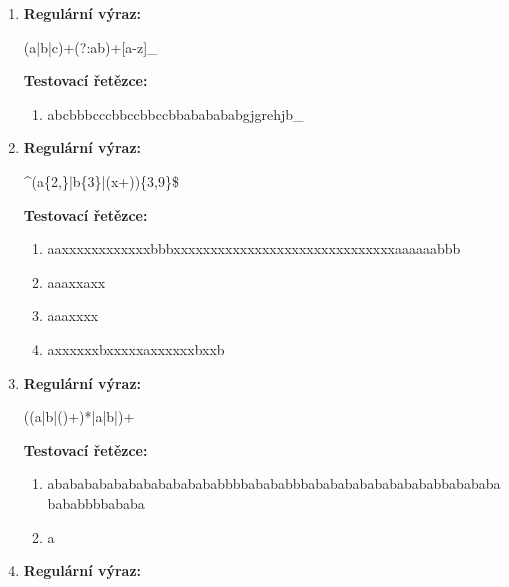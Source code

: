 \documentclass[czech,bachelor]{diploma}
\begin{document}
\begin{enumerate}
    \item 
    \noindent\textbf{Regulární výraz:} 

    (a|b|c)+(?:ab)+[a-z]\_

    \noindent\textbf{Testovací řetězce:}

    \begin{enumerate}
        \item abcbbbcccbbccbbccbbababababgjgrehjb\_ \setlength\parindent{1em} \textcolor{Red}{\XSolid} \label{itm:TD_4a}
    \end{enumerate}


    \item 
    \noindent\textbf{Regulární výraz:} 

    \textasciicircum (a\{2,\}|b\{3\}|(x+))\{3,9\}\$

    \noindent\textbf{Testovací řetězce:}

    \begin{enumerate}
        \item aaxxxxxxxxxxxxbbbxxxxxxxxxxxxxxxxxxxxxxxxxxxxxxaaaaaabbb \setlength\parindent{1em} \textcolor{OliveGreen}{\Checkmark} \label{itm:TD_5a}
        \item aaaxxaxx \setlength\parindent{1em} \textcolor{Red}{\XSolid}
        \item aaaxxxx \setlength\parindent{1em} \textcolor{OliveGreen}{\Checkmark}
        \item axxxxxxbxxxxxaxxxxxxbxxb \setlength\parindent{1em} \textcolor{Red}{\XSolid}
    \end{enumerate}


    \item 
    \noindent\textbf{Regulární výraz:} 
    
    ((a|b|()+)*|a|b|)+

    \noindent\textbf{Testovací řetězce:}

    \begin{enumerate}
        \item \parbox[t]{14cm}{ababababababababababababbbbabababbbabababababababababbababababababbbbab\-aba \setlength\parindent{1em} \textcolor{OliveGreen}{\Checkmark}} \label{itm:TD_6a}
        \item a \setlength\parindent{1em} \textcolor{OliveGreen}{\Checkmark}
    \end{enumerate}


    \item 
    \noindent\textbf{Regulární výraz:} 


\end{enumerate}
\end{document}
